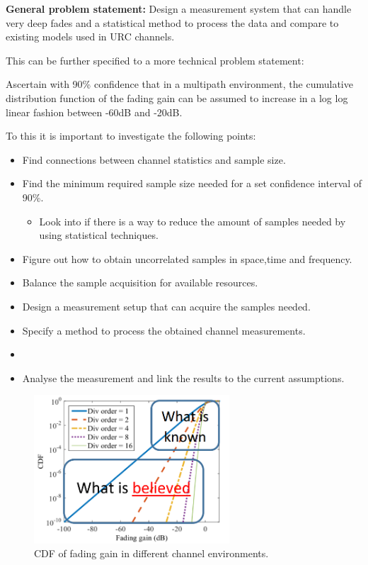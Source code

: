 \textbf{General problem statement:}
Design a measurement system that can handle very deep fades and a statistical method to process the data and compare to existing models used in URC channels.

This can be further specified to a more technical problem statement:

Ascertain with 90\% confidence that in a multipath environment, the cumulative distribution function of the fading gain can be assumed to increase in a log log linear fashion between -60dB and -20dB.

To this it is important to investigate the following points:

\begin{itemize}
	\item Find connections between channel statistics and sample size.
	\item Find the minimum required sample size needed for a set confidence interval of 90\%.
	\begin{itemize}
	\item Look into if there is a way to 		reduce the amount of samples 	needed by using statistical techniques.
 	\end{itemize}
	\item Figure out how to obtain uncorrelated samples in space,time and frequency.
	\item Balance the sample acquisition for available resources. 
	\item Design  a measurement setup that can acquire the samples needed.
	\item Specify a method to process the obtained channel measurements.
	\item 
	\item Analyse the measurement and link the results to the current assumptions.
\end{itemize}

\begin{figure}[H]
\centering
\includegraphics[width=0.65\textwidth]{figures/fading_gain.png}
\caption{\Gls{CDF} of fading gain in different channel environments.}
\label{fading_gain}
\end{figure}


